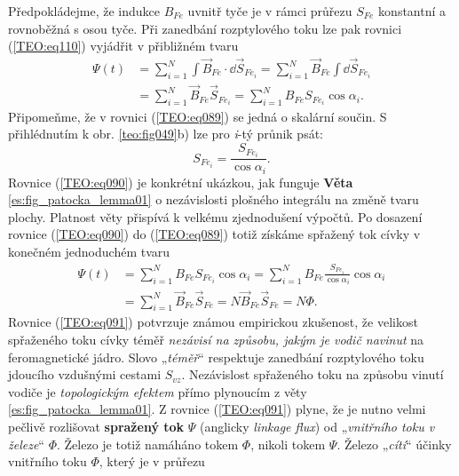       Předpokládejme, že indukce \(B_{Fe}\) uvnitř tyče je v rámci průřezu \(S_{Fe}\) konstantní a 
      rovnoběžná s osou tyče. Při zanedbání rozptylového toku lze pak rovnici 
      (\ref{TEO:eq110}) vyjádřit v přibližném tvaru
      \begin{align}\label{TEO:eq089}
      \Psi(t) &= \sum_{i=1}^{N}\int\vec{B}_{Fe}\cdot \dd{\vec{S}}_{Fe_i} 
               = \sum_{i=1}^{N}\vec{B}_{Fe}\int \dd{\vec{S}}_{Fe_i}  \nonumber\\
              &= \sum_{i=1}^{N}\vec{B}_{Fe}\vec{S}_{Fe_i}
               = \sum_{i=1}^{N}B_{Fe}{S}_{Fe_i}\cos\alpha_i.
      \end{align}
      Připomeňme, že v rovnici (\ref{TEO:eq089}) se jedná o skalární součin. S přihlédnutím 
      k obr. \ref{teo:fig049}b) lze pro \emph{i}-tý průnik psát:
      \begin{equation}\label{TEO:eq090}
        S_{Fe_i} = \frac{S_{Fe_i}}{\cos\alpha_i}.
      \end{equation}
      Rovnice (\ref{TEO:eq090}) je konkrétní ukázkou, jak funguje \textbf{Věta}
      \ref{es:fig_patocka_lemma01} o nezávislosti plošného integrálu na změně tvaru plochy. Platnost
      věty přispívá k velkému zjednodušení výpočtů. Po dosazení rovnice (\ref{TEO:eq090}) do
      (\ref{TEO:eq089}) totiž získáme spřažený tok cívky v konečném jednoduchém tvaru
      \begin{align}\label{TEO:eq091}
        \Psi(t) &= \sum_{i=1}^{N}B_{Fe}{S}_{Fe_i}\cos\alpha_i 
                 = \sum_{i=1}^{N}B_{Fe}\frac{{S}_{Fe_i}}{\cos\alpha_i}\cos\alpha_i  \nonumber\\
                &= \sum_{i=1}^{N}\vec{B}_{Fe}\vec{S}_{Fe}
                 = N\vec{B}_{Fe}\vec{S}_{Fe} = N\Phi.
      \end{align}
      Rovnice (\ref{TEO:eq091}) potvrzuje známou empirickou zkušenost, že velikost spřaženého toku
      cívky téměř \emph{nezávisí na způsobu, jakým je vodič navinut} na feromagnetické jádro. Slovo
      „\emph{téměř}“ respektuje zanedbání rozptylového toku jdoucího vzdušnými cestami \(S_{vz}\).
      Nezávislost spřaženého toku na způsobu vinutí vodiče je \emph{topologickým efektem} přímo
      plynoucím z věty \ref{es:fig_patocka_lemma01}. Z rovnice (\ref{TEO:eq091}) plyne, že je nutno
      velmi pečlivě rozlišovat \textbf{spražený tok} \(\Psi\) (anglicky \emph{linkage flux}) od
      „\emph{vnitřního toku v železe}“ \(\Phi\). Železo je totiž namáháno tokem \(\Phi\), nikoli
      tokem \(\Psi\). Železo „\emph{cítí}“ účinky vnitřního toku \(\Phi\), který je v průřezu
